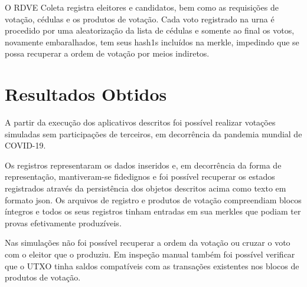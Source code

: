 O RDVE Coleta registra eleitores e candidatos, bem como as requisições de votação, cédulas e os produtos de votação. Cada voto registrado na urna é procedido por uma aleatorização da lista de cédulas e somente ao final os votos, novamente embaralhados, tem seus \glspl{hash1} incluídos na \gls{merkle}, impedindo que se possa recuperar a ordem de votação por meios indiretos. 

\section{Resultados Obtidos}

A partir da execução dos aplicativos descritos foi possível realizar votações simuladas sem participações de terceiros, em decorrência da pandemia mundial de COVID-19.

Os registros representaram os dados inseridos e, em decorrência da forma de representação, mantiveram-se fidedignos e foi possível recuperar os estados registrados através da persistência dos objetos descritos acima como texto em formato \gls{json}. Os arquivos de registro e produtos de votação compreendiam blocos íntegros e todos os seus registros tinham entradas em sua \glspl{merkle} que podiam ter provas efetivamente produzíveis. 

Nas simulações não foi possível recuperar a ordem da votação ou cruzar o voto com o eleitor que o produziu. Em inspeção manual também foi possível verificar que o UTXO tinha saldos compatíveis com as transações existentes nos blocos de produtos de votação. 